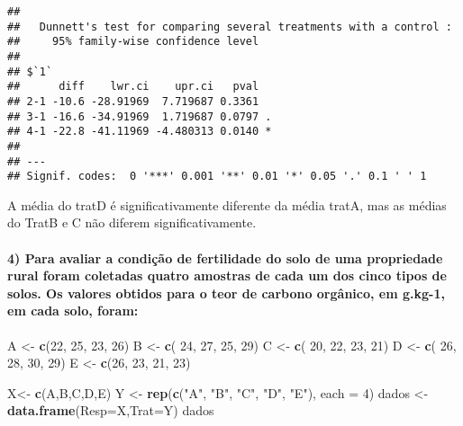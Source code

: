 \documentclass[
]{article}
\newenvironment{Shaded}{\begin{snugshade}}{\end{snugshade}}
\newcommand{\AttributeTok}[1]{\textcolor[rgb]{0.13,0.29,0.53}{#1}}
\newcommand{\DecValTok}[1]{\textcolor[rgb]{0.00,0.00,0.81}{#1}}
\newcommand{\FunctionTok}[1]{\textcolor[rgb]{0.13,0.29,0.53}{\textbf{#1}}}
\newcommand{\NormalTok}[1]{#1}
\newcommand{\OtherTok}[1]{\textcolor[rgb]{0.56,0.35,0.01}{#1}}
\newcommand{\StringTok}[1]{\textcolor[rgb]{0.31,0.60,0.02}{#1}}
\begin{document}
\begin{verbatim}
## 
##   Dunnett's test for comparing several treatments with a control :  
##     95% family-wise confidence level
## 
## $`1`
##      diff    lwr.ci    upr.ci   pval    
## 2-1 -10.6 -28.91969  7.719687 0.3361    
## 3-1 -16.6 -34.91969  1.719687 0.0797 .  
## 4-1 -22.8 -41.11969 -4.480313 0.0140 *  
## 
## ---
## Signif. codes:  0 '***' 0.001 '**' 0.01 '*' 0.05 '.' 0.1 ' ' 1
\end{verbatim}

A média do tratD é significativamente diferente da média tratA, mas as
médias do TratB e C não diferem significativamente.

\hypertarget{para-avaliar-a-condiuxe7uxe3o-de-fertilidade-do-solo-de-uma-propriedade-rural-foram-coletadas-quatro-amostras-de-cada-um-dos-cinco-tipos-de-solos.-os-valores-obtidos-para-o-teor-de-carbono-orguxe2nico-em-g.kg-1-em-cada-solo-foram}{%
\paragraph{4) Para avaliar a condição de fertilidade do solo de uma
propriedade rural foram coletadas quatro amostras de cada um dos cinco
tipos de solos. Os valores obtidos para o teor de carbono orgânico, em
g.kg-1, em cada solo,
foram:}\label{para-avaliar-a-condiuxe7uxe3o-de-fertilidade-do-solo-de-uma-propriedade-rural-foram-coletadas-quatro-amostras-de-cada-um-dos-cinco-tipos-de-solos.-os-valores-obtidos-para-o-teor-de-carbono-orguxe2nico-em-g.kg-1-em-cada-solo-foram}}

\begin{Shaded}
\begin{Highlighting}[]
\NormalTok{A }\OtherTok{\textless{}{-}} \FunctionTok{c}\NormalTok{(}\DecValTok{22}\NormalTok{, }\DecValTok{25}\NormalTok{, }\DecValTok{23}\NormalTok{, }\DecValTok{26}\NormalTok{)}
\NormalTok{B }\OtherTok{\textless{}{-}} \FunctionTok{c}\NormalTok{( }\DecValTok{24}\NormalTok{, }\DecValTok{27}\NormalTok{, }\DecValTok{25}\NormalTok{, }\DecValTok{29}\NormalTok{)}
\NormalTok{C }\OtherTok{\textless{}{-}} \FunctionTok{c}\NormalTok{( }\DecValTok{20}\NormalTok{, }\DecValTok{22}\NormalTok{, }\DecValTok{23}\NormalTok{, }\DecValTok{21}\NormalTok{)}
\NormalTok{D }\OtherTok{\textless{}{-}} \FunctionTok{c}\NormalTok{( }\DecValTok{26}\NormalTok{, }\DecValTok{28}\NormalTok{, }\DecValTok{30}\NormalTok{, }\DecValTok{29}\NormalTok{)}
\NormalTok{E }\OtherTok{\textless{}{-}} \FunctionTok{c}\NormalTok{(}\DecValTok{26}\NormalTok{, }\DecValTok{23}\NormalTok{, }\DecValTok{21}\NormalTok{, }\DecValTok{23}\NormalTok{)}

\NormalTok{X}\OtherTok{\textless{}{-}} \FunctionTok{c}\NormalTok{(A,B,C,D,E)}
\NormalTok{Y }\OtherTok{\textless{}{-}} \FunctionTok{rep}\NormalTok{(}\FunctionTok{c}\NormalTok{(}\StringTok{"A"}\NormalTok{, }\StringTok{"B"}\NormalTok{, }\StringTok{"C"}\NormalTok{, }\StringTok{"D"}\NormalTok{, }\StringTok{"E"}\NormalTok{), }\AttributeTok{each =} \DecValTok{4}\NormalTok{)}
\NormalTok{dados }\OtherTok{\textless{}{-}} \FunctionTok{data.frame}\NormalTok{(}\AttributeTok{Resp=}\NormalTok{X,}\AttributeTok{Trat=}\NormalTok{Y)}
\NormalTok{dados}
\end{Highlighting}
\end{Shaded}
\end{document}
